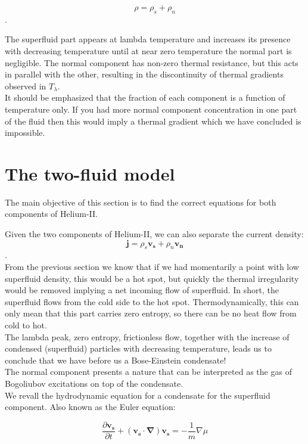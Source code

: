 \documentclass{article}
\begin{document}
\[\rho = \rho_s + \rho_n\].

The superfluid part appears at lambda temperature and increases its presence with decreasing temperature until at near zero temperature the normal part is negligible. The normal component has non-zero thermal resistance, but this acts in parallel with the other, resulting in the discontinuity of thermal gradients observed in $T_\lambda$.
\\

It should be emphasized that the fraction of each component is a function of temperature only. If you had more normal component concentration in one part of the fluid then this would imply a thermal gradient which we have concluded is impossible.
\\

\section{The two-fluid model}


The main objective of this section is to find the correct equations for both components of Helium-II.

Given the two components of Helium-II, we can also separate the current density:
\[\mathbf{j} = \rho_s \mathbf{v_s}+\rho_n \mathbf{v_n}\].
\\

From the previous section we know that if we had momentarily a point with low superfluid density, this would be a hot spot, but quickly the thermal irregularity would be removed implying a net incoming flow of superfluid. In short, the superfluid flows from the cold side to the hot spot. Thermodynamically, this can only mean that this part carries zero entropy, so there can be no heat flow from cold to hot.
\\

The lambda peak, zero entropy, frictionless flow, together with the increase of condensed (superfluid) particles with decreasing temperature, leads us to conclude that we have before us a Bose-Einstein condensate!
\\

The normal component presents a nature that can be interpreted as the gas of Bogoliubov excitations on top of the condensate.
\\

We revall the hydrodynamic equation for a condensate for the superfluid component. Also known as the Euler equation: 

\[\frac{\partial \mathbf{v_s}}{\partial t} + (\mathbf{v_s}\cdot \mathbf{\nabla})\mathbf{v_s} = -\frac{1}{m}\nabla \mu\]
\end{document}
